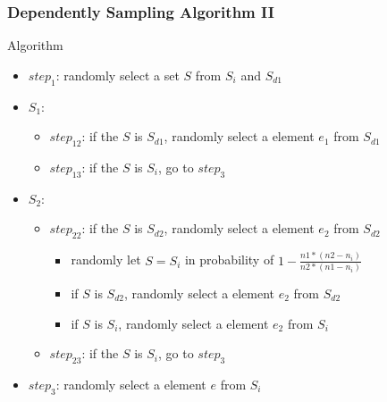 \documentclass[notheorems, aspectratio=54]{beamer}
\begin{document}
\begin{frame}
    \frametitle{Dependently Sampling Algorithm II}
    \begin{block}{Algorithm}
        \begin{itemize}
            \item $step_{1}$: randomly select a set $S$ from $S_i$ and $S_{d1}$
            \item $S_1$:
            \begin{itemize}
                \item $step_{12}$: if the $S$ is $S_{d1}$, randomly select a element $e_1$ from $S_{d1}$
                \item $step_{13}$: if the $S$ is $S_i$, go to $step_{3}$
            \end{itemize}
            \item $S_2$:
            \begin{itemize}
                \item $step_{22}$: if the $S$ is $S_{d2}$, randomly select a element $e_2$ from $S_{d2}$
                \begin{itemize}
                    \item randomly let $S = S_{i}$ in probability of $1-\frac{n1*(n2-n_i)}{n2*(n1-n_i)}$
                    \item if $S$ is $S_{d2}$, randomly select a element $e_2$ from $S_{d2}$
                    \item if $S$ is $S_i$, randomly select a element $e_2$ from $S_{i}$
                \end{itemize}
                \item $step_{23}$: if the $S$ is $S_i$, go to $step_3$
            \end{itemize}
            \item $step_{3}$: randomly select a element $e$ from $S_i$
        \end{itemize}
    \end{block}
\end{frame}
\end{document}

